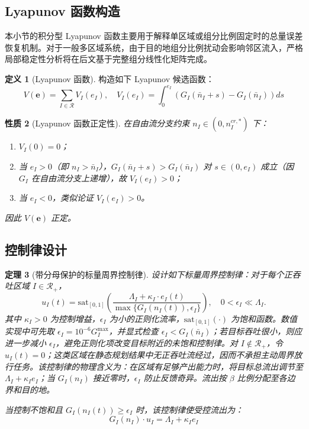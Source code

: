 \documentclass[a4paper,12pt]{article}
\theoremstyle{plain}
\newtheorem{theorem}{定理}[section]
\newtheorem{property}[theorem]{性质}
\theoremstyle{definition}
\newtheorem{definition}[theorem]{定义}
\theoremstyle{remark}
\begin{document}
\subsection{Lyapunov 函数构造}

本小节的积分型 Lyapunov 函数主要用于解释单区域或组分比例固定时的总量误差恢复机制。对于一般多区域系统，由于目的地组分比例扰动会影响邻区流入，严格局部稳定性分析将在后文基于完整组分线性化矩阵完成。

\begin{definition}[Lyapunov 函数]\label{def:lyapunov}
构造如下 Lyapunov 候选函数：
\begin{equation}\label{eq:lyapunov}
    V(\bm{e}) = \sum_{I \in \mathcal{R}} V_I(e_I), \quad V_I(e_I) = \int_0^{e_I} \left( G_I(\bar{n}_I + s) - G_I(\bar{n}_I) \right) ds
\end{equation}
\end{definition}

\begin{property}[Lyapunov 函数正定性]\label{prop:lyapunov_positive}
在自由流分支约束 $n_I \in (0, n_I^{cr,*})$ 下：
\begin{enumerate}
    \item $V_I(0) = 0$；
    \item 当 $e_I > 0$（即 $n_I > \bar{n}_I$），$G_I(\bar{n}_I + s) > G_I(\bar{n}_I)$ 对 $s \in (0, e_I)$ 成立（因 $G_I$ 在自由流分支上递增），故 $V_I(e_I) > 0$；
    \item 当 $e_I < 0$，类似论证 $V_I(e_I) > 0$。
\end{enumerate}
因此 $V(\bm{e})$ 正定。
\end{property}

\subsection{控制律设计}

\begin{theorem}[带分母保护的标量周界控制律]\label{thm:control_law}
设计如下标量周界控制律：对于每个正吞吐区域 $I \in \mathcal{R}_+$，
\begin{equation}\label{eq:control_law}
    u_I(t) = \text{sat}_{[0,1]}\left( \frac{\Lambda_I + \kappa_I \cdot e_I(t)}{\max\{G_I(n_I(t)),\epsilon_I\}} \right),
    \quad 0<\epsilon_I\ll \Lambda_I .
\end{equation}
其中 $\kappa_I > 0$ 为控制增益，$\epsilon_I$ 为小的正则化流率，$\text{sat}_{[0,1]}(\cdot)$ 为饱和函数。数值实现中可先取 $\epsilon_I=10^{-6}G_I^{\max}$，并显式检查 $\epsilon_I<G_I(\bar n_I)$；若目标吞吐很小，则应进一步减小 $\epsilon_I$，避免正则化项改变目标附近的未饱和控制律。对 $I\notin\mathcal R_+$，令 $u_I(t)=0$；这类区域在静态规划结果中无正吞吐流经过，因而不承担主动周界放行任务。该控制律的物理含义为：在区域有足够产出能力时，将目标总流出调节至 $\Lambda_I+\kappa_I e_I$；当 $G_I(n_I)$ 接近零时，$\epsilon_I$ 防止反馈奇异。流出按 $\beta$ 比例分配至各边界和目的地。

当控制不饱和且 $G_I(n_I(t))\ge \epsilon_I$ 时，该控制律使受控流出为：
\begin{equation}\label{eq:controlled_outflow}
    G_I(n_I) \cdot u_I = \Lambda_I + \kappa_I e_I
\end{equation}
\end{theorem}
\end{document}

